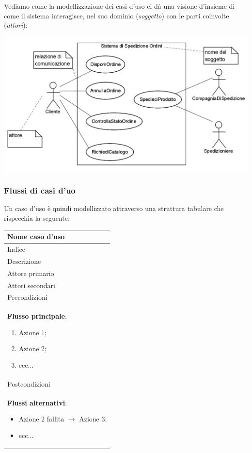 \documentclass[a4paper,11pt]{article}
\begin{document}
\par\smallskip

Vediamo come la modellizzazione dei casi d'uso ci dà una visione d'insieme di come il sistema interagisce, nel suo dominio (\textit{soggetto}) con le parti coinvolte (\textit{attori}):
\begin{center}
	\includegraphics[scale=0.4]{../figures/casi_uso_comp.png}
\end{center}

\subsubsection{Flussi di casi d'uo}
Un caso d'uso è quindi modellizzato attraverso una struttura tabulare che rispecchia la seguente:
\begin{table}[H]
	\center 
	\begin{tabular} { | p{10cm} | }
		\hline
		\bfseries Nome caso d'uso \\ 
		\hline
		Indice \\ 
		\hline
		Descrizione \\ 
		\hline
		Attore primario \\ 
		\hline
		Attori secondari \\ 
		\hline
		Precondizioni \\
		\hline
		\textbf{Flusso principale}:
		\begin{enumerate}
			\item Azione 1;
			\item Azione 2;
			\item ecc...
		\end{enumerate} \\
		\hline
		Postcondizioni \\ 
		\hline
		\textbf{Flussi alternativi}:
		\begin{itemize}
			\item Azione 2 fallita $\rightarrow$ Azione 3;
			\item ecc...
		\end{itemize} \\
		\hline
	\end{tabular}
\end{table}
\end{document}
